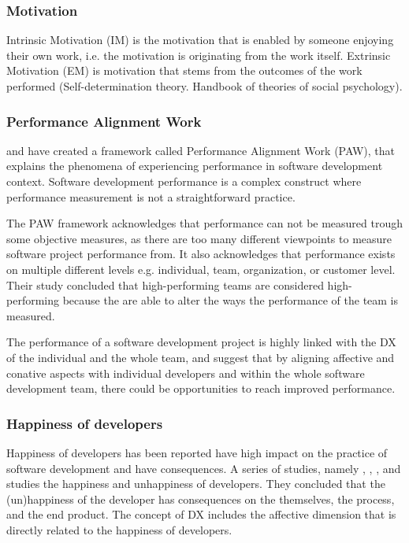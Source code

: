 \documentclass[english, 12pt, a4paper, sci, utf8, a-1b, online]{aaltothesis}
\begin{document}
\subsubsection{Motivation}

Intrinsic Motivation (IM) is the motivation that is enabled by someone enjoying their own work, i.e. the motivation is originating from the work itself. Extrinsic Motivation (EM) is motivation that stems from the outcomes of the work performed \parencite{flow-intrinsic-dx} (Self-determination theory. Handbook of theories of social psychology).

\subsubsection{Performance Alignment Work}

\textcite{how-developers-experience-team-performance} and \textcite{paw} have created a framework called Performance Alignment Work (PAW), that explains the phenomena of experiencing performance in software development context. Software development performance is a complex construct where performance measurement is not a straightforward practice.

The PAW framework acknowledges that performance can not be measured trough some objective measures, as there are too many different viewpoints to measure software project performance from. It also acknowledges that performance exists on multiple different levels e.g. individual, team, organization, or customer level. Their study concluded that high-performing teams are considered high-performing because the are able to alter the ways the performance of the team is measured.

The performance of a software development project is highly linked with the DX of the individual and the whole team, and \textcite{how-developers-experience-team-performance} suggest that by aligning affective and conative aspects with individual developers and within the whole software development team, there could be opportunities to reach improved performance.

\subsubsection{Happiness of developers}

Happiness of developers has been reported have high impact on the practice of software development and have consequences. A series of studies, namely \textcite{unhappy-developers}, \textcite{on-the-unhappiness}, \textcite{consequences-of-unhappiness}, and \textcite{what-happens-when-unhappy} studies the happiness and unhappiness of developers. They concluded that the (un)happiness of the developer has consequences on the themselves, the process, and the end product. The concept of DX \parencite{fagerholm-dx-concept-and-definition} includes the affective dimension that is directly related to the happiness of developers.
\end{document}
